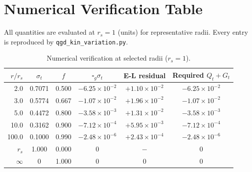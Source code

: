 \documentclass[11pt,a4paper]{article}
\theoremstyle{plain}
\theoremstyle{definition}
\newcommand{\sigt}{\sigma_t}
\newcommand{\rs}{r_s}
\newcommand{\boxg}{\square_g}
\begin{document}
\appendix
\section{Numerical Verification Table}
\label{app:numerics}

All quantities are evaluated at $\rs = 1$ (units) for representative radii.
Every entry is reproduced by \texttt{qgd\_kin\_variation.py}.

\begin{table}[h]
\centering
\caption{Numerical verification at selected radii ($\rs=1$).}
\label{tab:numerics}
\renewcommand{\arraystretch}{1.35}
\begin{tabular}{rccccc}
\toprule
$r/\rs$ & $\sigt$ & $f$ & $\boxg\sigt$ & E-L residual & Required $Q_t+G_t$ \\
\midrule
2.0  & 0.7071 & 0.500 & $-6.25\times10^{-2}$ & $+1.10\times10^{-2}$ & $-6.25\times10^{-2}$ \\
3.0  & 0.5774 & 0.667 & $-1.07\times10^{-2}$ & $+1.96\times10^{-2}$ & $-1.07\times10^{-2}$ \\
5.0  & 0.4472 & 0.800 & $-3.58\times10^{-3}$ & $+1.31\times10^{-2}$ & $-3.58\times10^{-3}$ \\
10.0 & 0.3162 & 0.900 & $-7.12\times10^{-4}$ & $+5.95\times10^{-3}$ & $-7.12\times10^{-4}$ \\
100.0 & 0.1000 & 0.990 & $-2.48\times10^{-6}$ & $+2.43\times10^{-4}$ & $-2.48\times10^{-6}$ \\
\midrule
$r_s$ & 1.000 & 0.000 & $0$ & $-$ & $0$ \\
$\infty$ & 0 & 1.000 & $0$ & $0$ & $0$ \\
\bottomrule
\end{tabular}
\end{table}
\end{document}
